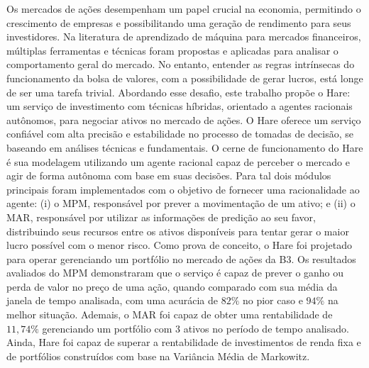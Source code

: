 
Os mercados de ações desempenham um papel crucial na economia, permitindo o crescimento de empresas e possibilitando uma geração de rendimento para seus investidores. Na literatura de aprendizado de máquina para mercados financeiros, múltiplas ferramentas e técnicas foram propostas e aplicadas para analisar o comportamento geral do mercado. No entanto, entender as regras intrínsecas do funcionamento da bolsa de valores, com a possibilidade de gerar lucros, está longe de ser uma tarefa trivial. Abordando esse desafio, este trabalho propõe o Hare: um serviço de investimento com técnicas híbridas, orientado a agentes racionais autônomos, para negociar ativos no mercado de ações. O Hare oferece um serviço confiável com alta precisão e estabilidade no processo de tomadas de decisão, se baseando em análises técnicas e fundamentais. O cerne de funcionamento do Hare é sua modelagem utilizando um agente racional capaz de perceber o mercado e agir de forma autônoma com base em suas decisões. Para tal dois módulos principais foram implementados com o objetivo de fornecer uma racionalidade ao agente: (i) o \acrfull{MPM}, responsável por prever a movimentação de um ativo; e (ii) o \acrfull{MAR}, responsável por utilizar as informações de predição ao seu favor, distribuindo seus recursos entre os ativos disponíveis para tentar gerar o maior lucro possível com o menor risco. Como prova de conceito, o Hare foi projetado para operar gerenciando um portfólio no mercado de ações da B3. Os resultados avaliados do \acrshort{MPM} demonstraram que o serviço 
é capaz de prever o ganho ou perda de valor no preço de uma ação, quando comparado com sua média da janela de tempo analisada, com uma acurácia de $82\%$ no pior caso e $94\%$ na melhor situação. Ademais, o \acrshort{MAR} foi capaz de obter uma rentabilidade de $11,74\%$ gerenciando um portfólio com $3$ ativos no período de tempo analisado. Ainda, Hare foi capaz de superar a rentabilidade de investimentos de renda fixa e de portfólios construídos com base na Variância Média de Markowitz.%
